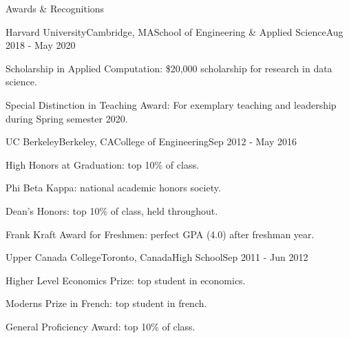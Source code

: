 \documentclass{resume} %
\begin{document}
\begin{rSection}{Awards \& Recognitions}

\begin{rSubsection}{Harvard University}{Cambridge, MA}{School of Engineering \& Applied Science}{Aug 2018 - May 2020}

\item Scholarship in Applied Computation: \$20,000 scholarship for research in data science.
\item Special Distinction in Teaching Award: For exemplary teaching and leadership during Spring semester 2020.

\end{rSubsection}

\begin{rSubsection}{UC Berkeley}{Berkeley, CA}{College of Engineering}{Sep 2012 - May 2016}

\item High Honors at Graduation: top 10\% of class.
\item Phi Beta Kappa: national academic honors society.
\item Dean's Honors: top 10\% of class, held throughout.
\item Frank Kraft Award for Freshmen: perfect GPA (4.0) after freshman year.

\end{rSubsection}

\begin{rSubsection}{Upper Canada College}{Toronto, Canada}{High School}{Sep 2011 - Jun 2012}

\item Higher Level Economics Prize: top student in economics.
\item Moderns Prize in French: top student in french.
\item General Proficiency Award: top 10\% of class.

\end{rSubsection}

\end{rSection}

\end{document}
